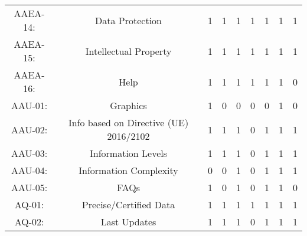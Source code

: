 \documentclass[a4paper, twoside]{report}
\begin{document}
\begin{table}[htbp]
\begin{adjustbox}{max width=\linewidth}
\begin{tabular}{rcccccccc}
    \multicolumn{1}{c}{AAEA-14:} & \multicolumn{1}{p{19em}}{Data Protection} & 1     & 1     & 1     & 1     & 1     & 1     & 1 \\
    \multicolumn{1}{c}{AAEA-15:} & \multicolumn{1}{p{19em}}{Intellectual Property} & 1     & 1     & 1     & 1     & 1     & 1     & 1 \\
    \multicolumn{1}{c}{AAEA-16:} & \multicolumn{1}{p{19em}}{Help} & 1     & 1     & 1     & 1     & 1     & 1     & 0 \\
    \midrule
    \multicolumn{1}{c}{AAU-01:} & \multicolumn{1}{p{19em}}{Graphics} & 1     & 0     & 0     & 0     & 0     & 1     & 0 \\
    \multicolumn{1}{c}{AAU-02:} & \multicolumn{1}{p{19em}}{Info based on Directive (UE) 2016/2102} & 1     & 1     & 1     & 0     & 1     & 1     & 1 \\
    \multicolumn{1}{c}{AAU-03:} & \multicolumn{1}{p{19em}}{\cellcolor[rgb]{ .749,  .749,  .749}Information Levels} & \cellcolor[rgb]{ .749,  .749,  .749}1 & \cellcolor[rgb]{ .749,  .749,  .749}1 & \cellcolor[rgb]{ .749,  .749,  .749}1 & \cellcolor[rgb]{ .749,  .749,  .749}0 & \cellcolor[rgb]{ .749,  .749,  .749}1 & \cellcolor[rgb]{ .749,  .749,  .749}1 & \cellcolor[rgb]{ .749,  .749,  .749}1 \\
    \multicolumn{1}{c}{AAU-04:} & \multicolumn{1}{p{19em}}{\cellcolor[rgb]{ .749,  .749,  .749}Information Complexity} & \cellcolor[rgb]{ .749,  .749,  .749}0 & \cellcolor[rgb]{ .749,  .749,  .749}0 & \cellcolor[rgb]{ .749,  .749,  .749}1 & \cellcolor[rgb]{ .749,  .749,  .749}0 & \cellcolor[rgb]{ .749,  .749,  .749}1 & \cellcolor[rgb]{ .749,  .749,  .749}1 & \cellcolor[rgb]{ .749,  .749,  .749}1 \\
    \multicolumn{1}{c}{AAU-05:} & \multicolumn{1}{p{19em}}{\cellcolor[rgb]{ .749,  .749,  .749}FAQs} & \cellcolor[rgb]{ .749,  .749,  .749}1 & \cellcolor[rgb]{ .749,  .749,  .749}0 & \cellcolor[rgb]{ .749,  .749,  .749}1 & \cellcolor[rgb]{ .749,  .749,  .749}0 & \cellcolor[rgb]{ .749,  .749,  .749}1 & \cellcolor[rgb]{ .749,  .749,  .749}1 & \cellcolor[rgb]{ .749,  .749,  .749}0 \\
    \midrule
    \multicolumn{1}{c}{AQ-01:} & \multicolumn{1}{p{19em}}{Precise/Certified Data} & 1     & 1     & 1     & 1     & 1     & 1     & 1 \\
    \multicolumn{1}{c}{AQ-02:} & \multicolumn{1}{p{19em}}{\cellcolor[rgb]{ .749,  .749,  .749}Last Updates} & \cellcolor[rgb]{ .749,  .749,  .749}1 & \cellcolor[rgb]{ .749,  .749,  .749}1 & \cellcolor[rgb]{ .749,  .749,  .749}1 & \cellcolor[rgb]{ .749,  .749,  .749}0 & \cellcolor[rgb]{ .749,  .749,  .749}1 & \cellcolor[rgb]{ .749,  .749,  .749}1 & \cellcolor[rgb]{ .749,  .749,  .749}1 \\

\end{tabular}
\end{adjustbox}
\end{table}
\end{document}

